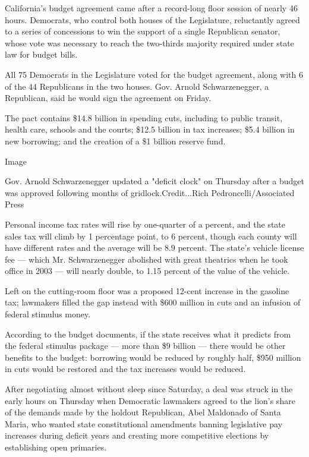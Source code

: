 California's budget agreement came after a record-long floor session of
nearly 46 hours. Democrats, who control both houses of the Legislature,
reluctantly agreed to a series of concessions to win the support of a
single Republican senator, whose vote was necessary to reach the
two-thirds majority required under state law for budget bills.

All 75 Democrats in the Legislature voted for the budget agreement,
along with 6 of the 44 Republicans in the two houses. Gov. Arnold
Schwarzenegger, a Republican, said he would sign the agreement on
Friday.

The pact contains \$14.8 billion in spending cuts, including to public
transit, health care, schools and the courts; \$12.5 billion in tax
increases; \$5.4 billion in new borrowing; and the creation of a \$1
billion reserve fund.

Image

Gov. Arnold Schwarzenegger updated a "deficit clock" on Thursday after a
budget was approved following months of gridlock.Credit...Rich
Pedroncelli/Associated Press

Personal income tax rates will rise by one-quarter of a percent, and the
state sales tax will climb by 1 percentage point, to 6 percent, though
each county will have different rates and the average will be 8.9
percent. The state's vehicle license fee --- which Mr. Schwarzenegger
abolished with great theatrics when he took office in 2003 --- will
nearly double, to 1.15 percent of the value of the vehicle.

Left on the cutting-room floor was a proposed 12-cent increase in the
gasoline tax; lawmakers filled the gap instead with \$600 million in
cuts and an infusion of federal stimulus money.

According to the budget documents, if the state receives what it
predicts from the federal stimulus package --- more than \$9 billion ---
there would be other benefits to the budget: borrowing would be reduced
by roughly half, \$950 million in cuts would be restored and the tax
increases would be reduced.

After negotiating almost without sleep since Saturday, a deal was struck
in the early hours on Thursday when Democratic lawmakers agreed to the
lion's share of the demands made by the holdout Republican, Abel
Maldonado of Santa Maria, who wanted state constitutional amendments
banning legislative pay increases during deficit years and creating more
competitive elections by establishing open primaries.


